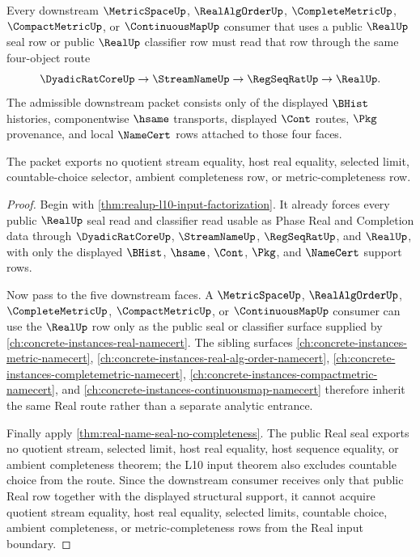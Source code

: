 \begin{theorem}
\label{thm:realup-l10-downstream-interface-nonescape}
Every downstream $\MetricSpaceUp$, $\RealAlgOrderUp$, $\CompleteMetricUp$, $\CompactMetricUp$, or $\ContinuousMapUp$ consumer that uses a public $\RealUp$ seal row or public $\RealUp$ classifier row must read that row through the same four-object route
$$
\DyadicRatCoreUp \to \StreamNameUp \to \RegSeqRatUp \to \RealUp .
$$
The admissible downstream packet consists only of the displayed $\BHist$ histories, componentwise $\hsame$ transports, displayed $\Cont$ routes, $\Pkg$ provenance, and local $\NameCert$ rows attached to those four faces.

The packet exports no quotient stream equality, host real equality, selected limit, countable-choice selector, ambient completeness row, or metric-completeness row.
\end{theorem}
\begin{proof}
Begin with \autoref{thm:realup-l10-input-factorization}. It already forces every public $\RealUp$ seal read and classifier read usable as Phase Real and Completion data through $\DyadicRatCoreUp$, $\StreamNameUp$, $\RegSeqRatUp$, and $\RealUp$, with only the displayed $\BHist$, $\hsame$, $\Cont$, $\Pkg$, and $\NameCert$ support rows.

Now pass to the five downstream faces. A $\MetricSpaceUp$, $\RealAlgOrderUp$, $\CompleteMetricUp$, $\CompactMetricUp$, or $\ContinuousMapUp$ consumer can use the $\RealUp$ row only as the public seal or classifier surface supplied by \autoref{ch:concrete-instances-real-namecert}. The sibling surfaces \autoref{ch:concrete-instances-metric-namecert}, \autoref{ch:concrete-instances-real-alg-order-namecert}, \autoref{ch:concrete-instances-completemetric-namecert}, \autoref{ch:concrete-instances-compactmetric-namecert}, and \autoref{ch:concrete-instances-continuousmap-namecert} therefore inherit the same Real route rather than a separate analytic entrance.

Finally apply \autoref{thm:real-name-seal-no-completeness}. The public Real seal exports no quotient stream, selected limit, host real equality, host sequence equality, or ambient completeness theorem; the L10 input theorem also excludes countable choice from the route. Since the downstream consumer receives only that public Real row together with the displayed structural support, it cannot acquire quotient stream equality, host real equality, selected limits, countable choice, ambient completeness, or metric-completeness rows from the Real input boundary.
\end{proof}

